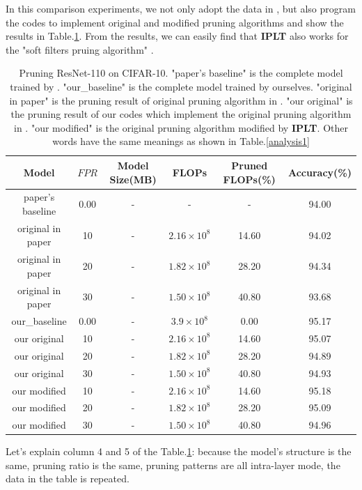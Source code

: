 \documentclass[runningheads]{llncs}
\begin{document}
In this comparison experiments, we not only adopt the data in \cite{b27}, but also program the codes to implement original and modified pruning algorithms and show the results in Table.\ref{analysis2}. From the results, we can easily find that \textbf{IPLT} also works for the "soft filters pruing algorithm" \cite{b27}.


\begin{table}[htbp]
 \caption{Pruning ResNet-110 on CIFAR-10. "paper's baseline" is the complete model trained by \cite{b27}. "our\_baseline" is the complete model trained by ourselves. "original in paper" is the pruning result of original pruning algorithm in \cite{b27}. "our original" is the pruning result of our codes which implement the original pruning algorithm in \cite{b27}. "our modified" is the original pruning algorithm modified by \textbf{IPLT}. Other words have the same meanings as shown in Table.\ref{analysis1}}
 \begin{tabular}{cccccc}
  \toprule
  Model&$FPR$&Model Size(MB)&FLOPs&Pruned FLOPs(\%)&Accuracy(\%)\\
  \midrule
  \hline
  paper's baseline&0.00&-&-&-&94.00\\
  \hline
  original in paper&10&-&$2.16 \times 10^8$&14.60&94.02\\
  original in paper&20&-&$1.82 \times 10^8$&28.20&94.34\\
  original in paper&30&-&$1.50 \times 10^8$&40.80&93.68\\
  \hline
  \hline
  our\_baseline&0.00&-&$3.9 \times 10^8$&0.00&95.17\\
  \hline
  our original&10&-&$2.16 \times 10^8$&14.60&95.07\\
  our original&20&-&$1.82 \times 10^8$&28.20&94.89\\
  our original&30&-&$1.50 \times 10^8$&40.80&94.93\\
  \hline
  our modified&10&-&$2.16 \times 10^8$&14.60&95.18\\
  our modified&20&-&$1.82 \times 10^8$&28.20&95.09\\
  our modified&30&-&$1.50 \times 10^8$&40.80&94.96\\

  \bottomrule
 \end{tabular}
\label{analysis2}
\end{table}

Let's explain column 4 and 5 of the Table.\ref{analysis2}: because the model's structure is the same, pruning ratio is the same, pruning patterns are all intra-layer mode, the data in the table is repeated.
\end{document}
